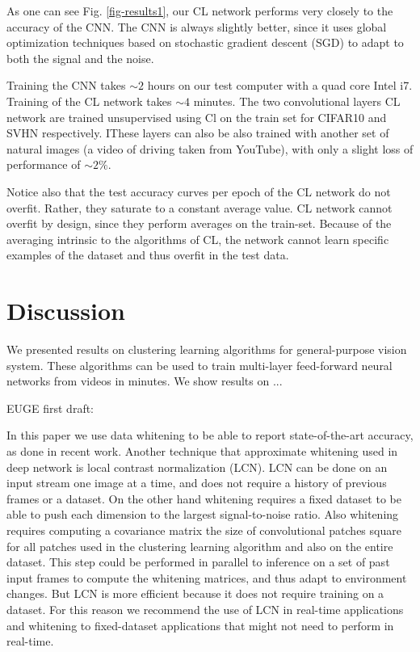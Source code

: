 \documentclass{article} %
\begin{document}
As one can see Fig. \ref{fig-results1}, our CL network performs very closely to the accuracy of the CNN. The CNN is always slightly better, since it uses global optimization techniques based on stochastic gradient descent (SGD) to adapt to both the signal and the noise. 

Training the CNN takes $\sim 2$ hours on our test computer with a quad core Intel i7. Training of the CL network takes $\sim 4$ minutes.
The two convolutional layers CL network are trained unsupervised using Cl on the train set for CIFAR10 and SVHN respectively. IThese layers can also be also trained with another set of natural images (a video of driving taken from YouTube), with only a slight loss of performance of $\sim 2\%$. 

Notice also that the test accuracy curves per epoch of the CL network do not overfit. Rather, they saturate to a constant average value. CL network cannot overfit by design, since they perform averages on the train-set. Because of the averaging intrinsic to the algorithms of CL, the network cannot learn specific examples of the dataset and thus overfit in the test data.


\section{Discussion}
\label{sec-disc}

We presented results on clustering learning algorithms for general-purpose vision system. These algorithms can be used to train multi-layer feed-forward neural networks from videos in minutes. We show results on ...


EUGE first draft:

In this paper we use data whitening to be able to report state-of-the-art accuracy, as done in recent work\cite{coates_analysis_2011,coates_analysis_2011,coates2012emergence,coates2012learning}. Another technique that approximate whitening used in deep network is local contrast normalization (LCN). LCN can be done on an input stream one image at a time, and does not require a history of previous frames or a dataset. On the other hand whitening requires a fixed dataset to be able to push each dimension to the largest signal-to-noise ratio. Also whitening requires computing a covariance matrix the size of convolutional patches square for all patches used in the clustering learning algorithm and also on the entire dataset. This step could be performed in parallel to inference on a set of past input frames to compute the whitening matrices, and thus adapt to environment changes. But LCN is more efficient because it does not require training on a dataset. For this reason we recommend the use of LCN in real-time applications and whitening to fixed-dataset applications that might not need to perform in real-time.
\end{document}
